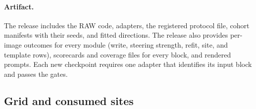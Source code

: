 \documentclass[11pt]{article}
\begin{document}
\paragraph{Artifact.} The release includes the RAW code, adapters, the registered protocol file, cohort manifests with their seeds, and fitted directions. The release also provides per-image outcomes for every module (write, steering strength, refit, site, and template rows), scorecards and coverage files for every block, and rendered prompts. Each new checkpoint requires one adapter that identifies its input block and passes the gates.

\subsection{Grid and consumed sites}
\label{app:cf-grid}
\end{document}
